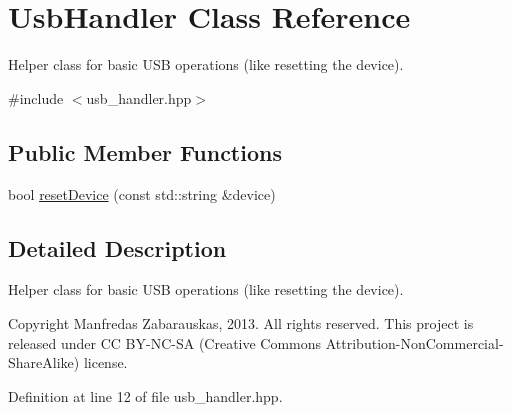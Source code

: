 \hypertarget{class_usb_handler}{\section{\-Usb\-Handler \-Class \-Reference}
\label{class_usb_handler}
}


\-Helper class for basic \-U\-S\-B operations (like resetting the device).  




{\ttfamily \#include $<$usb\-\_\-handler.\-hpp$>$}

\subsection*{\-Public \-Member \-Functions}
\begin{DoxyCompactItemize}
\item 
bool \hyperlink{class_usb_handler_aeb1c2b3c165ead7b56c7fab96d1f967c}{reset\-Device} (const std\-::string \&device)
\end{DoxyCompactItemize}


\subsection{\-Detailed \-Description}
\-Helper class for basic \-U\-S\-B operations (like resetting the device). 

\begin{DoxyCopyright}{\-Copyright}
\-Manfredas \-Zabarauskas, 2013. \-All rights reserved. \-This project is released under \-C\-C \-B\-Y-\/\-N\-C-\/\-S\-A (\-Creative \-Commons \-Attribution-\/\-Non\-Commercial-\/\-Share\-Alike) license. 
\end{DoxyCopyright}


\-Definition at line 12 of file usb\-\_\-handler.\-hpp.



